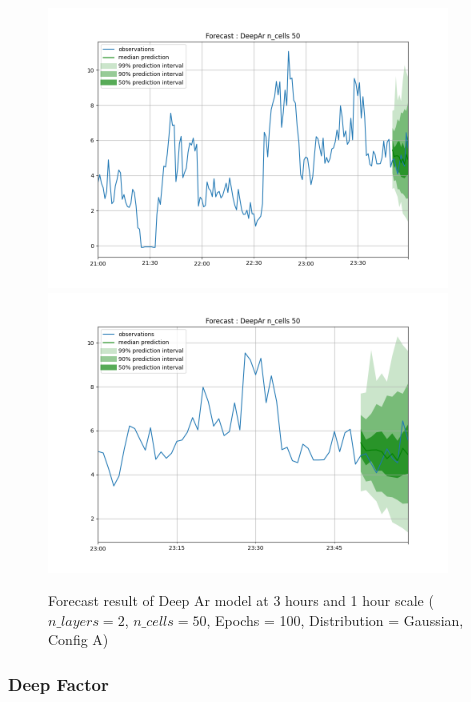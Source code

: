 \documentclass[a4paper, 12pt]{article}
\begin{document}
\begin{figure}[!h]
    \centering
    \includegraphics[width=400px]{plots/forecast/a/DeepAr/n_cells/50/180.png}
    \includegraphics[width=400px]{plots/forecast/a/DeepAr/n_cells/50/60.png}
    \caption{Forecast result of Deep Ar model at 3 hours and 1 hour scale ($n\_layers = 2$, $n\_cells = 50$, Epochs = 100, Distribution = Gaussian, Config A)}
    \label{fig:deepar}
\end{figure}

\subsubsection{Deep Factor} \label{comp_deepfactor}
\end{document}
